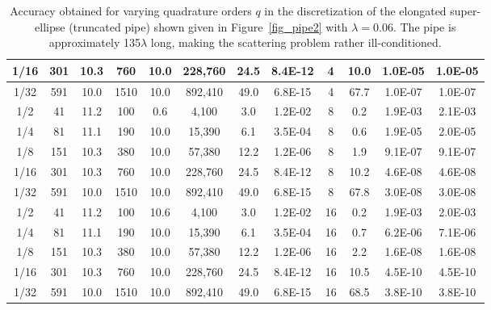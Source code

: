\documentclass[11pt]{article}
\numberwithin{equation}{section}
\begin{document}
\begin{table}[!b]
\begin{center}
\begin{subtable}{.95\linewidth}
{\begin{tabular}{|c|c|c|c|c|c|c|c|c|c|c|c|}
        1/16 & 301 & 10.3 & 760 &  10.0 & 228,760
            &  24.5 & 8.4E-12 & 4 & 10.0 &1.0E-05 & 1.0E-05 \\ \hline
        1/32 & 591 & 10.0 & 1510 &  10.0 & 892,410
            &  49.0 & 6.8E-15 & 4 & 67.7 & 1.0E-07 & 1.0E-07 \\ \hline \hline
        1/2 & 41 & 11.2 & 100 & 0.6  & 4,100 & 3.0
            & 1.2E-02 & 8 & 0.2 & 1.9E-03 & 2.1E-03 \\ \hline
        1/4 & 81 & 11.1 & 190 & 10.0 & 15,390 & 6.1
            & 3.5E-04 & 8 & 0.6 & 1.9E-05 & 2.0E-05 \\ \hline
        1/8 & 151 & 10.3  & 380 &  10.0 & 57,380
            &  12.2 & 1.2E-06 & 8 & 1.9 & 9.1E-07 & 9.1E-07 \\ \hline
        1/16 & 301 & 10.3 & 760 &  10.0 & 228,760
            &  24.5 & 8.4E-12 & 8 & 10.2 & 4.6E-08 & 4.6E-08 \\ \hline
        1/32 & 591 & 10.0 & 1510 &  10.0 & 892,410
            &  49.0 & 6.8E-15 & 8 & 67.8 & 3.0E-08 & 3.0E-08 \\ \hline \hline
        1/2 & 41 & 11.2 & 100 & 10.6  & 4,100 & 3.0
            & 1.2E-02 & 16 & 0.2 & 1.9E-03 & 2.0E-03 \\ \hline
        1/4 & 81 & 11.1 & 190 & 10.0 & 15,390 & 6.1
            & 3.5E-04 & 16 & 0.7 & 6.2E-06 & 7.1E-06 \\ \hline
        1/8 & 151 & 10.3  & 380 &  10.0 & 57,380
            &  12.2 & 1.2E-06 & 16 & 2.2 & 1.6E-08 & 1.6E-08 \\ \hline
        1/16 & 301 & 10.3 & 760 &  10.0 & 228,760
            &  24.5 & 8.4E-12 & 16 & 10.5 & 4.5E-10 & 4.5E-10 \\ \hline
        1/32 & 591 & 10.0 & 1510 &  10.0 & 892,410
            &  49.0 & 6.8E-15 & 16 & 68.5 & 3.8E-10 & 3.8E-10 \\ \hline
    \end{tabular}}
  \end{subtable}\\
  \vspace{\baselineskip}
\begin{subtable}{.9\linewidth}
  \centering
    \caption{Accuracy obtained for varying quadrature orders $q$ in the
      discretization of
      the elongated super-ellipse (truncated pipe) shown
      given in Figure~\ref{fig_pipe2} with $\lambda =
    0.06$. The pipe is approximately 135$\lambda$ long,
    making the scattering problem rather ill-conditioned.}
  \label{tab_pipe2}
      \resizebox{\linewidth}{!}{
}
\end{subtable}
\end{center}
\end{table}
\end{document}
